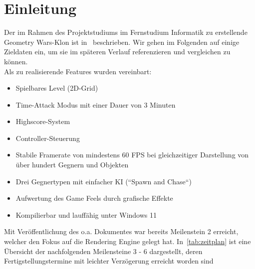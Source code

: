 \section{Einleitung}

Der im Rahmen des Projektstudiums im Fernstudium Informatik zu erstellende Geometry Wars-Klon ist in~\cite{SH25} beschrieben.
Wir gehen im Folgenden auf einige Zieldaten ein, um sie im späteren Verlauf referenzieren und vergleichen zu können.\\

\noindent
Als zu realisierende Features wurden vereinbart:

\begin{itemize}
    \itemsep0.5em
    \item Spielbares Level (2D-Grid)
    \item Time-Attack Modus mit einer Dauer von 3 Minuten
    \item Highscore-System
    \item Controller-Steuerung
    \item Stabile Framerate von mindestens 60 FPS bei gleichzeitiger Darstellung von über hundert Gegnern und Objekten
    \item Drei Gegnertypen mit einfacher KI (``Spawn and Chase``)
    \item Aufwertung des Game Feels durch grafische Effekte
    \item Kompilierbar und lauffähig unter Windows 11
\end{itemize}

\noindent
Mit Veröffentlichung des o.a. Dokumentes war bereits Meilenstein 2 erreicht, welcher den Fokus auf die Rendering Engine gelegt hat.
In~\ref{tab:zeitplan} ist eine Übersicht der nachfolgenden Meilensteine 3 - 6 dargestellt, deren Fertigstellungstermine mit leichter Verzögerung erreicht worden sind


